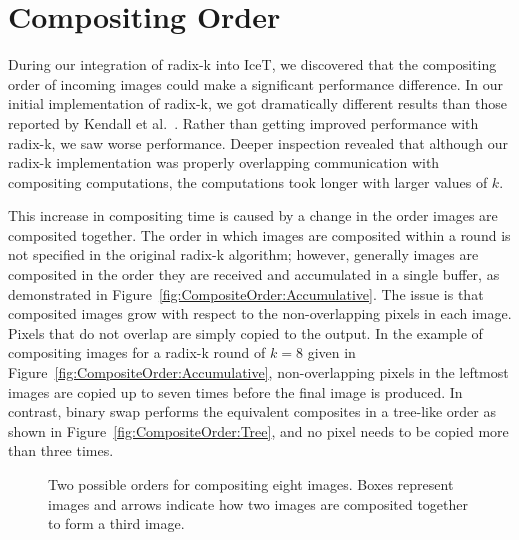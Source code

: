 \documentclass{acm_proc_article-sp}
\newcommand*{\scite}[1]{~\cite{#1}}
\newcommand{\etal}{et al.}
\begin{document}
\section{Compositing Order}
\label{sec:CompositingOrder}

During our integration of radix-k into IceT, we discovered that the
compositing order of incoming images could make a significant performance
difference.  In our initial implementation of radix-k, we got dramatically
different results than those reported by Kendall \etal\scite{Kendall2010}.
Rather than getting improved performance with radix-k, we saw worse
performance.  Deeper inspection revealed that although our radix-k
implementation was properly overlapping communication with compositing
computations, the computations took longer with larger values of $k$.

This increase in compositing time is caused by a change in the order images
are composited together.  The order in which images are composited within a
round is not specified in the original radix-k algorithm; however,
generally images are composited in the order they are received and
accumulated in a single buffer, as demonstrated in
Figure~\ref{fig:CompositeOrder:Accumulative}.  The issue is that composited
images grow with respect to the non-overlapping pixels in each image.
Pixels that do not overlap are simply copied to the output.  In the example
of compositing images for a radix-k round of $k=8$ given in
Figure~\ref{fig:CompositeOrder:Accumulative}, non-overlapping pixels in the
leftmost images are copied up to seven times before the final image is
produced.  In contrast, binary swap performs the equivalent composites in a
tree-like order as shown in Figure~\ref{fig:CompositeOrder:Tree}, and no
pixel needs to be copied more than three times.

\begin{figure}[htbp]
  \centering
  \quad
  \caption{Two possible orders for compositing eight images.  Boxes
    represent images and arrows indicate how two images are composited
    together to form a third image.}
  \label{fig:CompositeOrder}
\end{figure}
\end{document}
